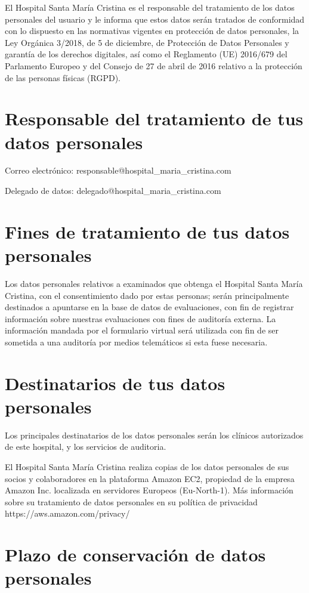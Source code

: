 \documentclass[12pt,a4paper,twoside,openright]{book}
\begin{document}
\begin{umaappendices}
El Hospital Santa María Cristina es el responsable del tratamiento de los datos personales del usuario y le informa que estos datos serán tratados de conformidad con lo dispuesto en las normativas vigentes en protección de datos personales, la Ley Orgánica 3/2018, de 5 de diciembre, de Protección de Datos Personales y garantía de los derechos digitales, así como el Reglamento (UE) 2016/679 del Parlamento Europeo y del Consejo de 27 de abril de 2016 relativo a la protección de las personas físicas (RGPD).

\section{Responsable del tratamiento de tus datos personales}

Correo electrónico: responsable@hospital\_maria\_cristina.com

Delegado de datos: delegado@hospital\_maria\_cristina.com

\section{Fines de tratamiento de tus datos personales}

Los datos personales relativos a examinados que obtenga el Hospital Santa María Cristina, con el consentimiento dado por estas personas; serán principalmente destinados a apuntarse en la base de datos de evaluaciones, con fin de registrar información sobre nuestras evaluaciones con fines de auditoría externa. La información mandada por el formulario virtual será utilizada con fin de ser sometida a una auditoría por medios telemáticos si esta fuese necesaria.

\section{Destinatarios de tus datos personales}

Los principales destinatarios de los datos personales serán los clínicos autorizados de este hospital, y los servicios de auditoria.

El Hospital Santa María Cristina realiza copias de los datos personales de sus socios y colaboradores en la plataforma Amazon EC2, propiedad de la empresa Amazon Inc. localizada en servidores Europeos (Eu-North-1). Más información sobre su tratamiento de datos personales en su política de privacidad https://aws.amazon.com/privacy/

\section{Plazo de conservación de datos personales}


\end{umaappendices}
\end{document}
